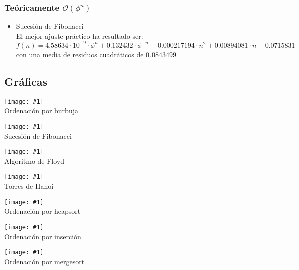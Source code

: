 \documentclass[a4paper, 11pt]{article} %
\newcommand{\imagen}[2]{\begin{center} \texttt{[image: \#1]} \\#2 \end{center}}
\begin{document}
  \subsubsection{Teóricamente $\mathcal{O}(\phi^n)$}
    \begin{itemize}
   \item Sucesión de Fibonacci\\
     El mejor ajuste práctico ha resultado ser: $f(n)=4.58634\cdot 10^{-9}\cdot {\phi}^n + 0.132432\cdot {\phi}^{-n}-0.000217194\cdot n^2+0.00894081\cdot n-0.0715831$
     con una media de residuos cuadráticos de $0.0843499$\\
     
     \noindent{}
  \end{itemize} 

\subsection {Gráficas}
\imagen{../regressionPlots/burbuja_fit.jpg}{Ordenación por burbuja}

\imagen{../regressionPlots/fibonacci_fit.jpg}{Sucesión de Fibonacci}

\imagen{../regressionPlots/floyd_fit.jpg}{Algoritmo de Floyd}

\imagen{../regressionPlots/hanoi_fit.jpg}{Torres de Hanoi}

\imagen{../regressionPlots/heapsort_fit.jpg}{Ordenación por heapsort}

\imagen{../regressionPlots/insercion_fit.jpg}{Ordenación por inserción}

\imagen{../regressionPlots/mergesort_fit.jpg}{Ordenación por mergesort}
\end{document}
